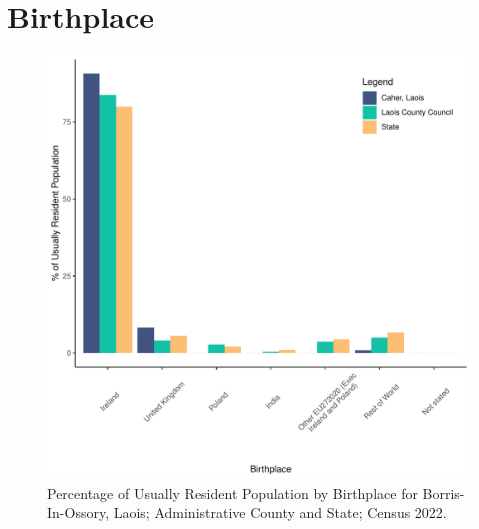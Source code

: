 \documentclass{article}
\begin{document}
\section{Birthplace}\label{sect:Birth}
\begin{figure}[H]
	\centering
	\includegraphics[width = 130mm]{../figures/BirthED.pdf}
	\caption{Percentage of Usually Resident Population by Birthplace for Borris-In-Ossory, Laois; Administrative County and State; Census 2022.}
	\label{fig:vbnv}
	\end{figure}
	
\end{document}
